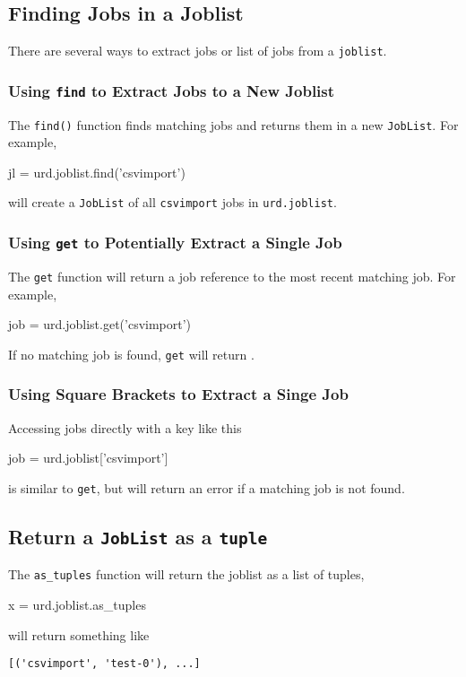 \subsection{Finding Jobs in a Joblist}
There are several ways to extract jobs or list of jobs from
a \texttt{joblist}.


\subsubsection*{Using \texttt{find} to Extract Jobs to a New Joblist}
The \texttt{find()} function finds matching jobs and returns them in a
new \texttt{JobList}.  For example,
\begin{python}
jl = urd.joblist.find('csvimport')
\end{python}
will create a \texttt{JobList} of all \texttt{csvimport} jobs
in \texttt{urd.joblist}.


\subsubsection*{Using \texttt{get} to Potentially Extract a Single Job}
The \texttt{get} function will return a job reference to the most
recent matching job.  For example,
\begin{python}
job = urd.joblist.get('csvimport')
\end{python}
If no matching job is found, \texttt{get} will return \pyNone.


\subsubsection*{Using Square Brackets to Extract a Singe Job}
Accessing jobs directly with a key like this
\begin{python}
job = urd.joblist['csvimport']
\end{python}
is similar to \texttt{get}, but will return an error if a matching job
is not found.


\subsection{Return a \texttt{JobList} as a \texttt{tuple}}
The \texttt{as\_tuples} function will return the joblist as a list of
tuples,
\begin{python}
x = urd.joblist.as_tuples
\end{python}
will return something like
\begin{verbatim}
[('csvimport', 'test-0'), ...]
\end{verbatim}



